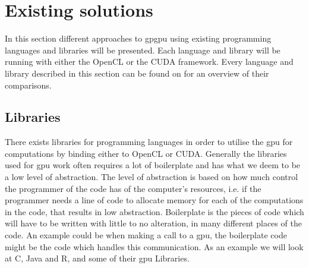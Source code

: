 \section{Existing solutions} %
\label{sec:state_of_the_art}
In this section different approaches to \acrshort{gpgpu} using existing programming languages and libraries will be presented.
Each language and library will be running with either the OpenCL or the CUDA framework.
Every language and library described in this section can be found on  for an overview of their comparisons.
      
\subsection{Libraries} 
There exists libraries for programming languages in order to utilise the \acrshort{gpu} for computations by binding either to OpenCL or CUDA.
Generally the libraries used for \acrshort{gpu} work often requires a lot of boilerplate and has what we deem to be a low level of abstraction.
The level of abstraction is based on how much control the programmer of the code has of the computer's resources, i.e. if the programmer needs a line of code to allocate memory for each of the computations in the code, that results in low abstraction.
Boilerplate is the pieces of code which will have to be written with little to no alteration, in many different places of the code.
An example could be when making a call to a \acrshort{gpu}, the boilerplate code might be the code which handles this communication.
As an example we will look at C, Java and R, and some of their \acrshort{gpu} Libraries.

